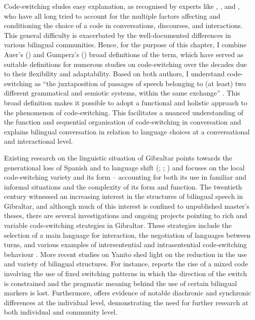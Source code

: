 \documentclass[output=paper]{langscibook}
\begin{document}
Code-switching eludes easy explanation, as recognised by experts like \citet{myers-scotton_review_2002},
\citet{gumperz_sociolinguistic_1977}, and 
\citet{auer_code-switching_1998}, who have all long tried to account for the multiple factors affecting and conditioning the choice of a code in conversations, discourses, and interactions. This general difficulty is exacerbated by the well-documented differences in various bilingual communities. Hence, for the purpose of this chapter, I combine Auer’s (\citeyear{auer_code-switching_1998}) and Gumperz’s (\citeyear{gumperz_sociolinguistic_1977}) broad definitions of the term, which have served as suitable definitions for numerous studies on code-switching over the decades due to their flexibility and adaptability. Based on both authors, I understand code-switching as “the juxtaposition of passages of speech belonging to (at least) two different grammatical and semiotic systems, within the same exchange” \citep[1]{gumperz_sociolinguistic_1977}. This broad definition makes it possible to adopt a functional and holistic approach to the phenomenon of code-switching. This facilitates a nuanced understanding of the function and sequential organisation of code-switching in conversation and explains bilingual conversation in relation to language choices at a conversational and interactional level. 

Existing research on the linguistic situation of Gibraltar points towards the generational loss of Spanish and to language shift
(\citealt{moyer_analysis_1993}; \citealt{kellermann_new_2001}; \citealt{feijoo_rodriguez_somos_2015})
and focuses on the local code-switching variety and its form – accounting for both its use in familiar and informal situations and the complexity of its form and function. The twentieth century witnessed an increasing interest in the structures of bilingual speech in Gibraltar, and although much of this interest is confined to unpublished master’s theses, there are several investigations and ongoing projects pointing to rich and variable code-switching strategies in Gibraltar. These strategies include the selection of a main language for interaction, the negotiation of languages between turns, and various examples of intersentential and intrasentential code-switching behaviour \citep{moyer_bilingual_1998}. More recent studies on Yanito shed light on the reduction in the use and variety of bilingual structures. For instance, \citet{goria_functional_2017} reports the rise of a mixed code involving the use of fixed switching patterns in which the direction of the switch is constrained and the pragmatic meaning behind the use of certain bilingual markers is lost. Furthermore, \citet{weston_code-switching_2013}  offers evidence of notable diachronic and synchronic differences at the individual level, demonstrating the need for further research at both individual and community level. 
\end{document}
